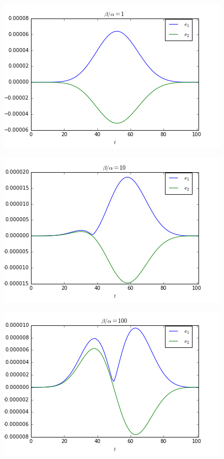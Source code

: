 \begingroup
\noindent
	\begin{minipage}{.3\textwidth} 
		\includegraphics[scale=.3]{figures/robin1Error.png}	
	\end{minipage}
	\hfill
	\begin{minipage}{.3\textwidth} 
		\includegraphics[scale=.3]{figures/robin10Error.png}	
	\end{minipage}
	\hfill
	\begin{minipage}{.3\textwidth}
		\includegraphics[scale=.3]{figures/robin100Error.png}	
	\end{minipage}
\endgroup

